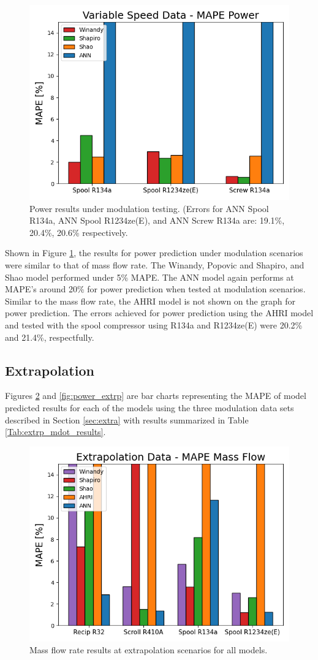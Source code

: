 \documentclass[preprint,11pt,authoryear]{elsarticle}
\begin{document}
\begin{figure}[!h]
\centering
\includegraphics[width=0.7\linewidth]{power_vspeed.png}
\caption{Power results under modulation testing. (Errors for ANN Spool R134a, ANN Spool R1234ze(E), and ANN Screw R134a are: 19.1\%, 20.4\%, 20.6\% respectively.}
\label{fig:power_vspd}
\end{figure}
\FloatBarrier

Shown in Figure \ref{fig:power_vspd}, the results for power prediction under modulation scenarios were similar to that of mass flow rate. The Winandy, Popovic and Shapiro, and Shao model performed under 5\% MAPE. The ANN model again performs at MAPE's around 20\% for power prediction when tested at modulation scenarios. Similar to the mass flow rate, the AHRI model is not shown on the graph for power prediction. The errors achieved for power prediction using the AHRI model and tested with the spool compressor using R134a and R1234ze(E) were  20.2\% and 21.4\%, respectfully.

\subsection{Extrapolation}
Figures \ref{fig:mdot_extrp} and \ref{fig:power_extrp} are bar charts representing the MAPE of model predicted results for each of the models using the three modulation data sets described in Section \ref{sec:extra} with results summarized in Table \ref{Tab:extrp_mdot_results}. 

\begin{figure}[!h]
\centering
\includegraphics[width=0.7\linewidth]{mdot_extrp.png}
\caption{Mass flow rate results at extrapolation scenarios for all models.}
\label{fig:mdot_extrp}
\end{figure}
\FloatBarrier
\end{document}
